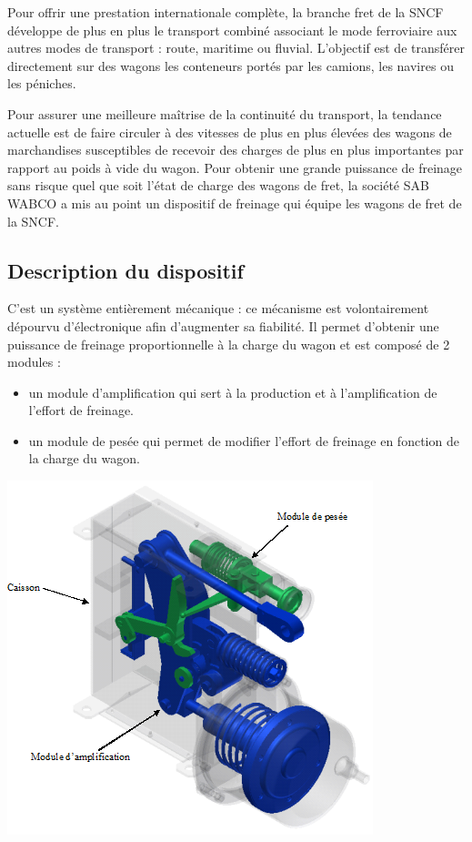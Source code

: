 \documentclass[11pt,oneside]{article}
\begin{document}
Pour offrir une prestation internationale complète, la branche fret de la SNCF développe de plus en plus le transport combiné associant le mode ferroviaire aux autres modes de transport : route, maritime ou fluvial. L'objectif est de transférer directement sur des wagons les conteneurs portés par les camions, les navires ou  les péniches.

Pour assurer une meilleure maîtrise de la continuité du transport, la tendance actuelle est de faire circuler à des vitesses de plus en plus élevées des wagons de marchandises susceptibles de recevoir des charges de plus en plus importantes par rapport au poids à vide du wagon.
Pour obtenir une grande puissance de freinage sans risque quel que soit l'état de charge des wagons de fret, la société SAB WABCO a mis au point un dispositif de freinage qui équipe les wagons de fret de la SNCF.

\subsection{Description du dispositif}
\begin{minipage}[c]{.3\linewidth}
C'est un système entièrement mécanique : ce mécanisme est volontairement dépourvu d'électronique afin d'augmenter sa fiabilité. Il permet d'obtenir une puissance de freinage proportionnelle à la charge du wagon et est composé de 2 modules : 
\begin{itemize}
\item un module d'amplification qui sert à la production et à l'amplification de l'effort de freinage.
\item un module de pesée qui permet de modifier l'effort de freinage en fonction de la charge du wagon.
\end{itemize}
\end{minipage}
\hfill
\begin{minipage}[c]{.65\linewidth}
\includegraphics[width=.95\textwidth]{png/img1}
\end{minipage}
\end{document}
